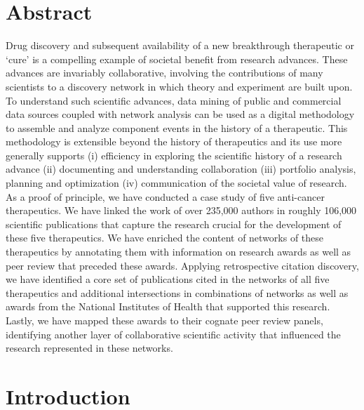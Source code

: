 \documentclass[10pt,letterpaper]{article}
\begin{document}
\section*{Abstract}

Drug discovery and subsequent availability of a new breakthrough therapeutic or `cure' is a compelling example of societal benefit from research advances. These advances are invariably collaborative, involving the contributions of many scientists to a discovery network in which theory and experiment are built upon. To understand such scientific advances, data mining of public and commercial data sources coupled with network analysis can be used as a digital methodology to assemble and analyze component events in the history of a therapeutic. This methodology is extensible beyond the history of therapeutics and its use more generally supports (i) efficiency in  exploring  the scientific history of a research advance (ii) documenting and understanding collaboration (iii) portfolio analysis, planning and optimization (iv) communication of the societal value of research.  As a proof of principle, we have conducted a case study of five anti-cancer therapeutics. We have linked the work of over 235,000 authors in roughly 106,000 scientific publications that capture the research crucial for the development of these five therapeutics. We have enriched the content of networks of these therapeutics by annotating them with information on research awards as well as peer review that preceded these awards. Applying retrospective citation discovery, we have identified a core set of publications cited in the networks of all five therapeutics and additional intersections in combinations of networks as well as awards from the National Institutes of Health that supported this research. Lastly, we have mapped these awards to their cognate peer review panels, identifying another layer of collaborative scientific activity that influenced the research represented in these networks. 

\linenumbers

\section*{Introduction}
\end{document}
